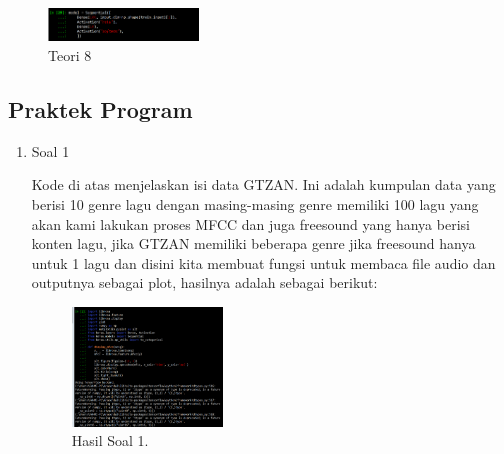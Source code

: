 \begin{enumerate}
	\begin{figure}[H]
	\centering
		\includegraphics[width=4cm]{figures/1174021/tugas6/materi/teori8.PNG}
		\caption{Teori 8}
	\end{figure}
\end{enumerate}

\subsection{Praktek Program}
\begin{enumerate}
	\item Soal 1
	\hfill\break
	
	Kode di atas menjelaskan isi data GTZAN. Ini adalah kumpulan data yang berisi 10 genre lagu dengan masing-masing genre memiliki 100 lagu yang akan kami lakukan proses MFCC dan juga freesound yang hanya berisi konten lagu, jika GTZAN memiliki beberapa genre jika freesound hanya untuk 1 lagu dan disini kita membuat fungsi untuk membaca file audio dan outputnya sebagai plot, hasilnya adalah sebagai berikut:
	\begin{figure}[H]
	\centering
		\includegraphics[width=4cm]{figures/1174021/tugas6/materi/hasil1.PNG}
		\caption{Hasil Soal 1.}
	\end{figure}


\end{enumerate}
